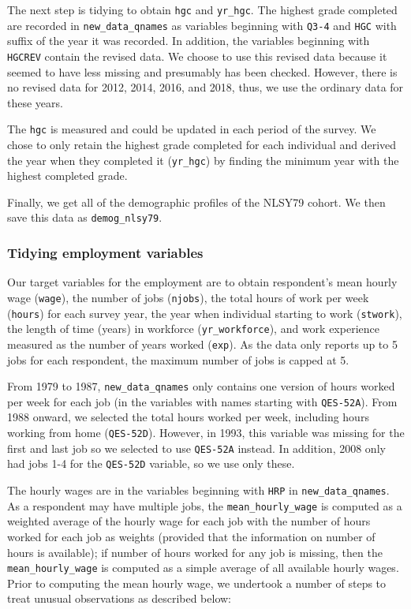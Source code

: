 \documentclass{article}
\begin{document}
The next step is tidying to obtain \texttt{hgc} and \texttt{yr\_hgc}. The highest grade completed are recorded in \texttt{new\_data\_qnames} as variables beginning with \texttt{Q3-4} and \texttt{HGC} with suffix of the year it was recorded. In addition, the variables beginning with \texttt{HGCREV} contain the revised data. We choose to use this revised data because it seemed to have less missing and presumably has been checked. However, there is no revised data for 2012, 2014, 2016, and 2018, thus, we use the ordinary data for these years.

The \texttt{hgc} is measured and could be updated in each period of the survey. We chose to only retain the highest grade completed for each individual and derived the year when they completed it (\texttt{yr\_hgc}) by finding the minimum year with the highest completed grade.

Finally, we get all of the demographic profiles of the NLSY79 cohort. We then save this data as \texttt{demog\_nlsy79}.

\hypertarget{tidyemp}{%
\subsubsection{Tidying employment variables}\label{tidyemp}}

Our target variables for the employment are to obtain respondent's mean hourly wage (\texttt{wage}), the number of jobs (\texttt{njobs}), the total hours of work per week (\texttt{hours}) for each survey year, the year when individual starting to work (\texttt{stwork}), the length of time (years) in workforce (\texttt{yr\_workforce}), and work experience measured as the number of years worked (\texttt{exp}). As the data only reports up to 5 jobs for each respondent, the maximum number of jobs is capped at 5.

From 1979 to 1987, \texttt{new\_data\_qnames} only contains one version of hours worked per week for each job (in the variables with names starting with \texttt{QES-52A}). From 1988 onward, we selected the total hours worked per week, including hours working from home (\texttt{QES-52D}). However, in 1993, this variable was missing for the first and last job so we selected to use \texttt{QES-52A} instead. In addition, 2008 only had jobs 1-4 for the \texttt{QES-52D} variable, so we use only these.

The hourly wages are in the variables beginning with \texttt{HRP} in \texttt{new\_data\_qnames}. As a respondent may have multiple jobs, the \texttt{mean\_hourly\_wage} is computed as a weighted average of the hourly wage for each job with the number of hours worked for each job as weights (provided that the information on number of hours is available); if number of hours worked for any job is missing, then the \texttt{mean\_hourly\_wage} is computed as a simple average of all available hourly wages. Prior to computing the mean hourly wage, we undertook a number of steps to treat unusual observations as described below:
\end{document}
